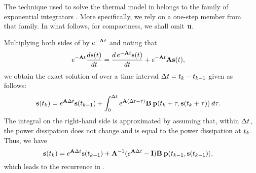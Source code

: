 The technique used to solve the thermal model in  belongs to the family of exponential integrators \cite{hochbruck2010}.
More specifically, we rely on a one-step member from that family.
In what follows, for compactness, we shall omit $\mathbf{u}$.

Multiplying both sides of  by $e^{- \mathbf{A} t}$ and noting that
\[
  e^{-\mathbf{A} t} \frac{d\mathbf{s}(t)}{dt} = \frac{d\, e^{-\mathbf{A} t} \mathbf{s}(t)}{dt} + e^{-\mathbf{A} t} \mathbf{A} \mathbf{s}(t),
\]
we obtain the exact solution of  over a time interval $\Delta t = t_k - t_{k - 1}$ given as follows:
\[
  \mathbf{s}(t_k) = e^{\mathbf{A} \Delta t} \mathbf{s}(t_{k - 1}) + \int_0^{\Delta t} e^{\mathbf{A} (\Delta t - \tau)} \mathbf{B} \: \mathbf{p}(t_k + \tau, \mathbf{s}(t_k + \tau)) \: d\tau.
\]
The integral on the right-hand side is approximated by assuming that, within $\Delta t$, the power dissipation does not change and is equal to the power dissipation at $t_k$.
Thus, we have
\[
  \mathbf{s}(t_k) = e^{\mathbf{A} \Delta t} \mathbf{s}(t_{k - 1}) + \mathbf{A}^{-1}(e^{\mathbf{A} \Delta t} - \mathbf{I}) \mathbf{B} \: \mathbf{p}(t_{k - 1}, \mathbf{s}(t_{k - 1})),
\]
which leads to the recurrence in .
